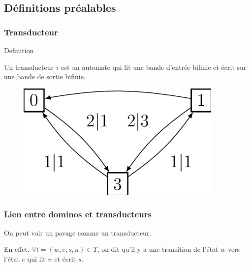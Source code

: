 \documentclass{beamer}
\begin{document}
\subsection{Définitions préalables}

\begin{frame}
\frametitle{Transducteur}

\begin{alertblock}{Definition}

Un transducteur $\tau$ est un automate qui lit une bande d'entrée bifinie et écrit sur une bande de sortie bifinie.
    
\end{alertblock}

\begin{figure}

    \includegraphics[scale = 1]{transducteur_exemple}
    \centering
    
\end{figure}

\end{frame}

\begin{frame}
\frametitle{Lien entre dominos et transducteurs}

On peut voir un pavage comme un transducteur.

En effet, $\forall t = (w,e,s,n) \in T$, on dit qu'il y a une transition de l'état $w$ vers l'état $e$ qui lit $n$ et écrit $s$.



\end{frame}
\end{document}
